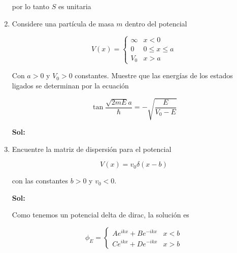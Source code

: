 \documentclass[12pt,a4paper]{article}
\begin{document}
\begin{enumerate}
    por lo tanto $S$ es unitaria
    
    
    
    
    
    
    
    
    
    
    \item Considere una partícula de masa $m$ dentro del potencial
    
    \begin{equation*}
        V(x) = \left\{\begin{matrix}
        \infty & x < 0 \\
        0 & 0 \leq x \leq a \\
        V_0 & x>a
        \end{matrix}\right.
    \end{equation*}
    
    Con $a>0$ y $V_0 > 0$ constantes. Muestre que las energías de los estados ligados se determinan por la ecuación
    
    \begin{equation*}
        \tan{\frac{\sqrt{2mE}a}{\hbar}} = - \sqrt{\frac{E}{V_0 - E}}
    \end{equation*}
    
    \textbf{Sol:}
    
    
    
    
    
    
    \item Encuentre la matriz de dispersión para el potencial
    
    \begin{equation*}
        V (x) = v_0 \delta (x-b)
    \end{equation*}
    
    con las constantes $b>0$ y $v_0 < 0$.
    
    \textbf{Sol:}
    
    Como tenemos un potencial delta de dirac, la solución es
    
    \begin{equation*}
        \phi_E = \left\{\begin{matrix}
        A e^{ikx} + B e^{-ikx} & x < b \\
        C e^{ikx} + D e^{-ikx} & x > b 
        \end{matrix}\right.
    \end{equation*}
    

\end{enumerate}
\end{document}
